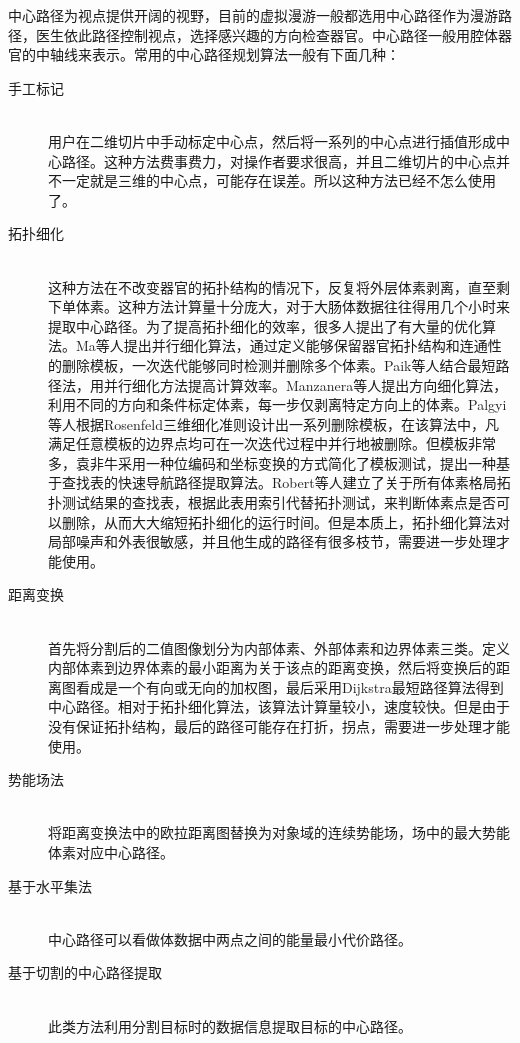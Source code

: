 中心路径为视点提供开阔的视野，目前的虚拟漫游一般都选用中心路径作为漫游路径，医生依此路径控制视点，选择感兴趣的方向检查器官。中心路径一般用腔体器官的中轴线来表示。常用的中心路径规划算法一般有下面几种：
\begin{description}
    \item[手工标记] \hfill \\
用户在二维切片中手动标定中心点，然后将一系列的中心点进行插值形成中心路径。这种方法费事费力，对操作者要求很高，并且二维切片的中心点并不一定就是三维的中心点，可能存在误差。所以这种方法已经不怎么使用了。
　　\item[拓扑细化] \hfill \\
这种方法在不改变器官的拓扑结构的情况下，反复将外层体素剥离，直至剩下单体素。这种方法计算量十分庞大，对于大肠体数据往往得用几个小时来提取中心路径。为了提高拓扑细化的效率，很多人提出了有大量的优化算法。Ma等人提出并行细化算法，通过定义能够保留器官拓扑结构和连通性的删除模板，一次迭代能够同时检测并删除多个体素。Paik等人结合最短路径法，用并行细化方法提高计算效率。Manzanera等人提出方向细化算法，利用不同的方向和条件标定体素，每一步仅剥离特定方向上的体素。Palgyi等人根据Rosenfeld三维细化准则设计出一系列删除模板，在该算法中，凡满足任意模板的边界点均可在一次迭代过程中并行地被删除。但模板非常多，袁非牛采用一种位编码和坐标变换的方式简化了模板测试，提出一种基于查找表的快速导航路径提取算法。Robert等人建立了关于所有体素格局拓扑测试结果的查找表，根据此表用索引代替拓扑测试，来判断体素点是否可以删除，从而大大缩短拓扑细化的运行时间。但是本质上，拓扑细化算法对局部噪声和外表很敏感，并且他生成的路径有很多枝节，需要进一步处理才能使用。
　　\item[距离变换] \hfill \\
首先将分割后的二值图像划分为内部体素、外部体素和边界体素三类。定义内部体素到边界体素的最小距离为关于该点的距离变换，然后将变换后的距离图看成是一个有向或无向的加权图，最后采用Dijkstra最短路径算法得到中心路径。相对于拓扑细化算法，该算法计算量较小，速度较快。但是由于没有保证拓扑结构，最后的路径可能存在打折，拐点，需要进一步处理才能使用。
　　\item[势能场法] \hfill \\
将距离变换法中的欧拉距离图替换为对象域的连续势能场，场中的最大势能体素对应中心路径。
　　\item[基于水平集法] \hfill \\
中心路径可以看做体数据中两点之间的能量最小代价路径。
　　\item[基于切割的中心路径提取] \hfill \\
此类方法利用分割目标时的数据信息提取目标的中心路径。
\end{description}

